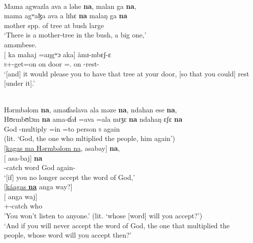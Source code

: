 \ea \label{ex:8:21}\\
Mama  agwazla  ava  a  ləhe  \textbf{na},  malan  ga  \textbf{na}, \\ 
\gll  mama   agʷaɮa       ava       a   lɪhɛ        \textbf{na}    malaŋ   ga  \textbf{na}\\
      mother   {spp. of tree}  {\EXT}   at   bush    {\PSP}  large     {\ADJ}  {\PSP}\\
\glt  ‘There is a mother-tree in the bush,  a big one,’\\
  aməmbese.\\
\gll  {}[  {ka} {mahaj} {=aŋgʷɔ} {aka}] {àmɪ{}-mbɛʃ{}-ɛ}\\
      \textsc{s}+{\PFV}-get=on   {\PSP}   on     door       ={\twoS}.{\POSS}      on   {\DEP}-rest-{\CL}\\
\glt  ‘[and] it would please you to have that tree at your door, [so that you could] rest [under it].’
\z

\ea \label{ex:8:22} \\
Hərmbəlom  \textbf{na},  amaɗaslava  ala  məze  \textbf{na},  ndahan  ese  \textbf{na},\\  
\gll  Hʊrmbʊlɔm   \textbf{na}  ama-ɗaɬ    =ava  =ala  mɪʒɛ  \textbf{na}   ndahaŋ  ɛʃɛ  \textbf{na}\\
      God      {\PSP}    {\DEP}-multiply  =in  =to   person   {\PSP}  \textsc{s}     again    {\PSP}  \\
\glt (lit. ‘God, the one who mltiplied the people, him again’) \\     
      
\medskip
{}[\underline{kagas  ma  Hərmbəlom  na},  asabay]  \textbf{na},\\  
\gll  {}[          asa-baj] \textbf{{na}}\\
      {\twoS}-catch   word     God  {\PSP}  again-{\NEG}  {\PSP}\\
\glt ‘[if] you no longer accept the word of God,’\\      
      
\medskip
{}[\underline{káagas  \textbf{na}}  anga  way?]\\
\gll  {}[  {anga} {waj}]\\
      {\twoS}+{\POT}-catch    {\PSP}   {\POSS}    who\\
\glt 'You won't listen to anyone.' (lit. ‘whose [word] will you accept?’) \\     
\glt  ‘And if you will never accept the word of God, the one that multiplied the people, whose word will you accept then?’\\
\z

